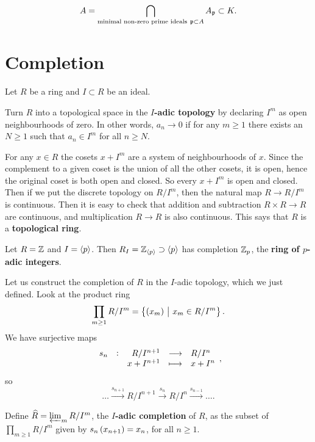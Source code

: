 \begin{remark*}
$$ A = \bigcap_{\text{minimal non-zero prime ideals} \ \mathfrak{p} \subset A} A_{\mathfrak{p}} \subset K. $$
\end{remark*}

\pagebreak

\section{Completion}

Let $ R $ be a ring and $ I \subset R $ be an ideal.

\begin{definition}
Turn $ R $ into a topological space in the \textbf{$ I $-adic topology} by declaring $ I^m $ as open neighbourhoods of zero. In other words, $ a_n \to 0 $ if for any $ m \ge 1 $ there exists an $ N \ge 1 $ such that $ a_n \in I^m $ for all $ n \ge N $.
\end{definition}

For any $ x \in R $ the cosets $ x + I^m $ are a system of neighbourhoods of $ x $. Since the complement to a given coset is the union of all the other cosets, it is open, hence the original coset is both open and closed. So every $ x + I^m $ is open and closed. Then if we put the discrete topology on $ R / I^m $, then the natural map $ R \to R / I^m $ is continuous. Then it is easy to check that addition and subtraction $ R \times R \to R $ are continuous, and multiplication $ R \to R $ is also continuous. This says that $ R $ is a \textbf{topological ring}.

\begin{example}
Let $ R = \mathbb{Z} $ and $ I = \left\langle p \right\rangle $. Then $ R_I = \mathbb{Z}_{\left\langle p \right\rangle} \supset \left\langle p \right\rangle $ has completion $ \mathbb{Z}_p $, the \textbf{ring of $ p $-adic integers}.
\end{example}

Let us construct the completion of $ R $ in the $ I $-adic topology, which we just defined. Look at the product ring
$$ \prod_{m \ge 1} R / I^m = \cbr{\br{x_m} \st x_m \in R / I^m}. $$
We have surjective maps
$$ \function[s_n]{R / I^{n + 1}}{R / I^n}{x + I^{n + 1}}{x + I^n}, $$
so
$$ \dots \xrightarrow{s_{n + 1}} R / I^{n + 1} \xrightarrow{s_n} R / I^n \xrightarrow{s_{n - 1}} \dots. $$

\begin{definition}
Define $ \widehat{R} = \varprojlim_m R / I^m $, the \textbf{$ I $-adic completion} of $ R $, as the subset of $ \prod_{m \ge 1} R / I^m $ given by $ s_n\br{x_{n + 1}} = x_n $, for all $ n \ge 1 $.
\end{definition}

